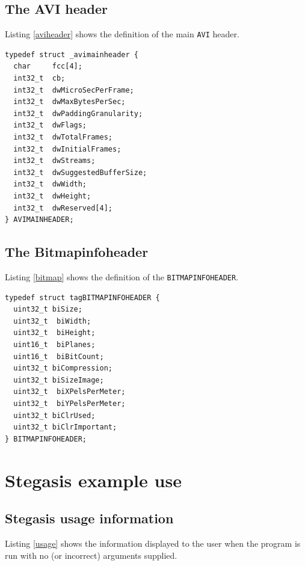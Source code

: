 \documentclass[paper=a4, fontsize=11pt,twoside]{scrartcl}
\numberwithin{table}{section}
\numberwithin{figure}{section}
\numberwithin{algorithm}{section}
\begin{document}
\vfill
\pagebreak

\subsection{The AVI header}

Listing \ref{aviheader} shows the definition of the main \texttt{AVI} header.

\begin{lstlisting}[caption={The \texttt{AVIMAINHEADER} structure.},frame=single, upquote=true,label=aviheader,showstringspaces=false]
typedef struct _avimainheader {
  char     fcc[4];
  int32_t  cb;
  int32_t  dwMicroSecPerFrame;
  int32_t  dwMaxBytesPerSec;
  int32_t  dwPaddingGranularity;
  int32_t  dwFlags;
  int32_t  dwTotalFrames;
  int32_t  dwInitialFrames;
  int32_t  dwStreams;
  int32_t  dwSuggestedBufferSize;
  int32_t  dwWidth;
  int32_t  dwHeight;
  int32_t  dwReserved[4];
} AVIMAINHEADER;
\end{lstlisting}

\subsection{The Bitmapinfoheader}

Listing \ref{bitmap} shows the definition of the \texttt{BITMAPINFOHEADER}.

\begin{lstlisting}[caption={The \texttt{BITMAPINFOHEADER} structure.},frame=single, upquote=true,label=bitmap,showstringspaces=false]
typedef struct tagBITMAPINFOHEADER {
  uint32_t biSize;
  uint32_t  biWidth;
  uint32_t  biHeight;
  uint16_t  biPlanes;
  uint16_t  biBitCount;
  uint32_t biCompression;
  uint32_t biSizeImage;
  uint32_t  biXPelsPerMeter;
  uint32_t  biYPelsPerMeter;
  uint32_t biClrUsed;
  uint32_t biClrImportant;
} BITMAPINFOHEADER;
\end{lstlisting}

\vfill
\pagebreak

\section{Stegasis example use} 
\label{app:steg}

\subsection{Stegasis usage information}

Listing \ref{usage} shows the information displayed to the user when the program is run with no (or incorrect) arguments supplied.
\end{document}
